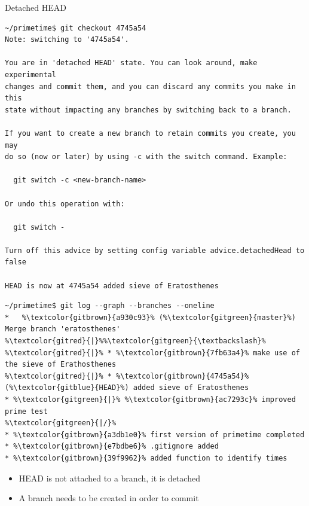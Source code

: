 \documentclass[svgnames]{beamer}
\begin{document}
\begin{frame}[fragile]{Detached HEAD}
 \begin{lstlisting}[basicstyle={\ttfamily\tiny}]
~/primetime$ git checkout 4745a54
Note: switching to '4745a54'.

You are in 'detached HEAD' state. You can look around, make experimental
changes and commit them, and you can discard any commits you make in this
state without impacting any branches by switching back to a branch.

If you want to create a new branch to retain commits you create, you may
do so (now or later) by using -c with the switch command. Example:

  git switch -c <new-branch-name>

Or undo this operation with:

  git switch -

Turn off this advice by setting config variable advice.detachedHead to false

HEAD is now at 4745a54 added sieve of Eratosthenes
 \end{lstlisting}

	\begin{lstlisting}[basicstyle={\ttfamily\tiny},escapechar=\%]
~/primetime$ git log --graph --branches --oneline
*   %\textcolor{gitbrown}{a930c93}% (%\textcolor{gitgreen}{master}%) Merge branch 'eratosthenes'
%\textcolor{gitred}{|}%%\textcolor{gitgreen}{\textbackslash}%
%\textcolor{gitred}{|}% * %\textcolor{gitbrown}{7fb63a4}% make use of the sieve of Erathosthenes
%\textcolor{gitred}{|}% * %\textcolor{gitbrown}{4745a54}% (%\textcolor{gitblue}{HEAD}%) added sieve of Eratosthenes
* %\textcolor{gitgreen}{|}% %\textcolor{gitbrown}{ac7293c}% improved prime test
%\textcolor{gitgreen}{|/}%
* %\textcolor{gitbrown}{a3db1e0}% first version of primetime completed
* %\textcolor{gitbrown}{e7bdbe6}% .gitignore added
* %\textcolor{gitbrown}{39f9962}% added function to identify times
 \end{lstlisting}

 \begin{itemize}
  \item HEAD is not attached to a branch, it is detached
  \item A branch needs to be created in order to commit
 \end{itemize}
\end{frame}
\end{document}
